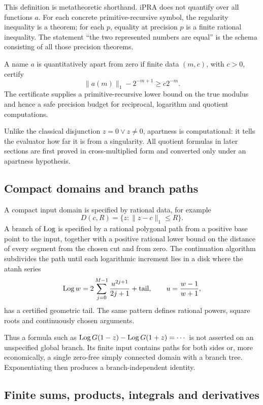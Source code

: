 This definition is metatheoretic shorthand.  iPRA does not quantify over all
functions \(a\).  For each concrete primitive-recursive symbol, the regularity
inequality is a theorem; for each \(p\), equality at precision \(p\) is a
finite rational inequality.  The statement ``the two represented numbers are
equal'' is the schema consisting of all those precision theorems.

\begin{definition}[Apartness]
A name \(a\) is quantitatively apart from zero if finite data \((m,c)\), with
\(c>0\), certify
\[
  \|a(m)\|_1-2^{-m+1}\ge c2^{-m}.
\]
The certificate supplies a primitive-recursive lower bound on the true
modulus and hence a safe precision budget for reciprocal, logarithm and
quotient computations.
\end{definition}

Unlike the classical disjunction \(z=0\lor z\ne0\), apartness is computational:
it tells the evaluator how far it is from a singularity.  All quotient formulas
in later sections are first proved in cross-multiplied form and converted only
under an apartness hypothesis.

\subsection{Compact domains and branch paths}

A compact input domain is specified by rational data, for example
\[
 D(c,R)=\{z:\|z-c\|_1\le R\}.
\]
A branch of \(\operatorname{Log}\) is specified by a rational polygonal path from a positive
base point to the input, together with a positive rational lower bound on the
distance of every segment from the chosen cut and from zero.  The continuation
algorithm subdivides the path until each logarithmic increment lies in a disk
where the atanh series
\[
 \operatorname{Log} w=2\sum_{j=0}^{M-1}\frac{u^{2j+1}}{2j+1}+\text{tail},
 \qquad u=\frac{w-1}{w+1},
\]
has a certified geometric tail.  The same pattern defines rational powers,
square roots and continuously chosen arguments.

Thus a formula such as
\(\operatorname{Log} G(1-z)-\operatorname{Log} G(1+z)=\cdots\) is not asserted on an unspecified global
branch.  Its finite input contains paths for both sides or, more economically,
a single zero-free simply connected domain with a branch tree.  Exponentiating
then produces a branch-independent identity.

\subsection{Finite sums, products, integrals and derivatives}

